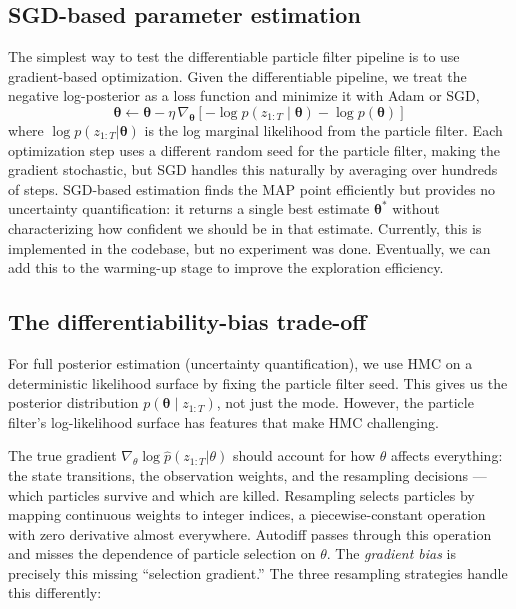 \documentclass{article}
\renewcommand{\v}[1]{ \ensuremath{ {\mathbf{#1}} }}
\begin{document}
\subsection{SGD-based parameter estimation}
The simplest way to test the differentiable particle filter pipeline is to use gradient-based optimization. Given the differentiable pipeline, we treat the negative log-posterior as a loss function and minimize it with Adam or SGD,
\begin{equation}
    \v \theta \leftarrow \v \theta - \eta \,\nabla_{\v \theta}\!\left[-\log p(z_{1:T} \mid \v\theta) - \log p(\v \theta)\right]
\end{equation}
where $\log p(z_{1:T}|\v\theta)$ is the log marginal likelihood from the particle filter. Each optimization step uses a different random seed for the particle filter, making the gradient stochastic, but SGD handles this naturally by averaging over hundreds of steps. SGD-based estimation finds the MAP point efficiently but provides no uncertainty quantification: it returns a single best estimate $\v\theta^*$ without characterizing how confident we should be in that estimate. Currently, this is implemented in the codebase, but no experiment was done. Eventually, we can add this to the warming-up stage to improve the exploration efficiency.


\subsection{The differentiability-bias trade-off}
For full posterior estimation (uncertainty quantification), we use HMC on a deterministic likelihood surface by fixing the particle filter seed. This gives us the posterior distribution $p(\v \theta \mid z_{1:T})$, not just the mode. However, the particle filter's log-likelihood surface has features that make HMC challenging.

The true gradient $\nabla_\theta \log \hat{p}(z_{1:T}|\theta)$ should account for how $\theta$ affects everything: the state transitions, the observation weights, and the resampling decisions --- which particles survive and which are killed. Resampling selects particles by mapping continuous weights to integer indices, a piecewise-constant operation with zero derivative almost everywhere. Autodiff passes through this operation and misses the dependence of particle selection on $\theta$. The \textit{gradient bias} is precisely this missing ``selection gradient.'' The three resampling strategies handle this differently:
\end{document}
